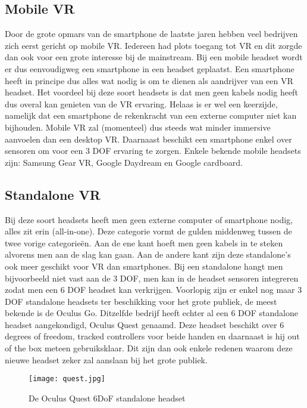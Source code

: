 \subsection{Mobile VR}
Door de grote opmars van de smartphone de laatste jaren hebben veel bedrijven zich eerst gericht op mobile VR. Iedereen had plots toegang tot VR en dit zorgde dan ook voor een grote interesse bij de mainstream. Bij een mobile headset wordt er dus eenvoudigweg een smartphone in een headset geplaatst.
Een smartphone heeft in principe dus alles wat nodig is om te dienen als aandrijver van een VR headset. Het voordeel bij deze soort headsets is dat men geen kabels nodig heeft dus overal kan genieten van de VR ervaring. Helaas is er wel een keerzijde, namelijk dat een smartphone de rekenkracht van een externe computer niet kan bijhouden. Mobile VR zal (momenteel) dus steeds wat minder immersive aanvoelen dan een desktop VR. Daarnaast beschikt een smartphone enkel over sensoren om voor een 3 DOF ervaring te zorgen.
Enkele bekende mobile headsets zijn: Samsung Gear VR, Google Daydream en Google cardboard.

\subsection{Standalone VR}
Bij deze soort headsets heeft men geen externe computer of smartphone nodig, alles zit erin (all-in-one). Deze categorie vormt de gulden middenweg tussen de twee vorige categorieën. Aan de ene kant hoeft men geen kabels in te steken alvorens men aan de slag kan gaan. Aan de andere kant zijn deze standalone's ook meer geschikt voor VR dan smartphones. Bij een standalone hangt men bijvoorbeeld niet vast aan de 3 DOF, men kan in de headset sensoren integreren zodat men een 6 DOF headset kan verkrijgen. Voorlopig zijn er enkel nog maar 3 DOF standalone headsets ter beschikking voor het grote publiek, de meest bekende is de Oculus Go. Ditzelfde bedrijf heeft echter al een 6 DOF standalone headset aangekondigd, Oculus Quest genaamd. Deze headset beschikt over 6 degrees of freedom, tracked controllers voor beide handen en daarnaast is hij out of the box meteen gebruiksklaar. Dit zijn dan ook enkele redenen waarom deze nieuwe headset zeker zal aanslaan bij het grote publiek.

\begin{figure}[h]
    \centering
    \texttt{[image: quest.jpg]}
    \caption{De Oculus Quest 6DoF standalone headset}
\end{figure}


